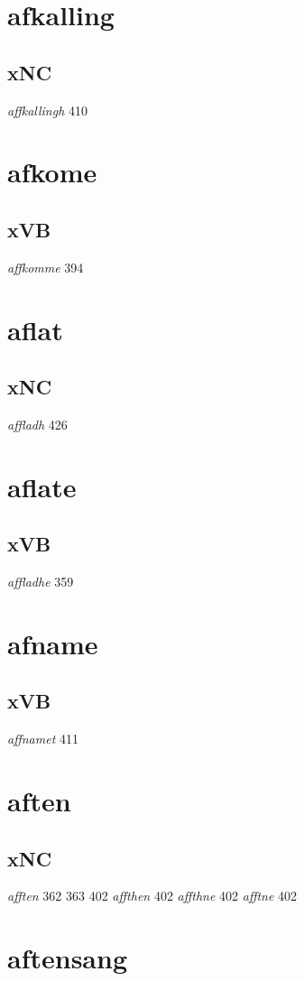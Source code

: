 \documentclass[a4paper,twocolumn]{article}
\begin{document}
\section{afkalling}
\label{sec:org6850d54}
\subsection{xNC}
\label{sec:org902b434}
\emph{affkallingh} 410 
\section{afkome}
\label{sec:orgc5de711}
\subsection{xVB}
\label{sec:org9b36394}
\emph{affkomme} 394 
\section{aflat}
\label{sec:orgd19b0df}
\subsection{xNC}
\label{sec:org4d04e60}
\emph{affladh} 426 
\section{aflate}
\label{sec:orgaa7d765}
\subsection{xVB}
\label{sec:org515bc01}
\emph{affladhe} 359 
\section{afname}
\label{sec:org3e4c10f}
\subsection{xVB}
\label{sec:orga775edf}
\emph{affnamet} 411 
\section{aften}
\label{sec:org1f55fca}
\subsection{xNC}
\label{sec:org75c6a20}
\emph{afften} 362 363 402 \emph{affthen} 402 \emph{affthne} 402 \emph{afftne} 402 
\section{aftensang}
\label{sec:org4aad995}
\end{document}
